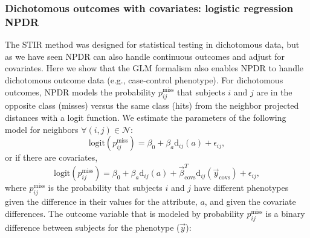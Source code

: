 \documentclass{bioinfo}
\begin{document}
\subsubsection{Dichotomous outcomes with covariates: logistic regression NPDR}
The STIR method was designed for statistical testing in dichotomous data, but as we have seen NPDR can also handle continuous outcomes and adjust for covariates.
Here we show that the GLM formalism also enables NPDR to handle dichotomous outcome data (e.g., case-control phenotype).
For dichotomous outcomes, NPDR models the probability $p^{\text{miss}}_{ij}$ that subjects $i$ and $j$ are in the opposite class (misses) versus the same class (hits) from the neighbor projected distances with a logit function.
We estimate the parameters of the following model for neighbors $\forall(i,j) \in \mathcal{N}$:   
\begin{equation}\label{eq:logit_nocovar}
\text{logit}(p^{\text{miss}}_{ij}) = \beta_0 + \beta_a \text{d}_{ij}(a) + \epsilon_{ij},   
\end{equation}
or if there are covariates,
\begin{equation}\label{eq:too_logit}
\text{logit}(p^{\text{miss}}_{ij}) = \beta_0 + \beta_a \text{d}_{ij}(a) + \vec{\beta}^{T}_{\text{covs}} \text{d}_{ij}(\vec{y}_{\text{covs}}) + \epsilon_{ij},   
\end{equation}
where $p^{\text{miss}}_{ij}$ is the probability that subjects $i$ and $j$ have different phenotypes given the difference in their values for the attribute, $a$, and given the covariate differences.
The outcome variable that is modeled by probability $p^{\text{miss}}_{ij}$ is a binary difference between subjects for the phenotype ($\vec{y}$):
   
\end{document}
